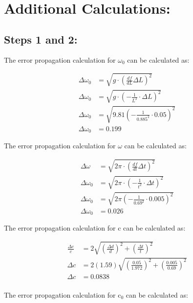 \documentclass[12pt, letterpaper, twoside]{article}
\begin{document}
\vfill\pagebreak

\appendix
\section{Additional Calculations:}

\subsection{Steps 1 and 2:}

The error propagation calculation for $\omega_0$ can be calculated as:

\begin{align*}
    \Delta\omega_0 &= \sqrt{g \cdot (\frac{df}{dL}\Delta L)^2} \\
    \Delta\omega_0 &= \sqrt{g \cdot (-\frac{1}{L^2}\cdot \Delta L)^2} \\
    \Delta\omega_0 &= \sqrt{9.81(-\frac{1}{0.885^2}\cdot 0.05)^2} \\
    \Delta\omega_0 &= 0.199
\end{align*}

The error propagation calculation for $\omega$ can be calculated as:

\begin{align*}
    \Delta\omega &= \sqrt{2\pi \cdot (\frac{df}{dt}\Delta t)^2} \\
    \Delta\omega_0 &= \sqrt{2\pi \cdot (-\frac{1}{t^2}\cdot \Delta t)^2} \\
    \Delta\omega_0 &= \sqrt{2\pi(-\frac{1}{0.69^2}\cdot 0.005)^2} \\
    \Delta\omega_0 &= 0.026
\end{align*}

The error propagation calculation for c can be calculated as:

\begin{align*}
    \frac{\Delta c}{c} &= 2\sqrt{(\frac{\Delta d}{d})^2 + (\frac{\Delta t}{t})^2} \\
    \Delta c &= 2(1.59)\sqrt{(\frac{0.05}{1.972})^2 + (\frac{0.005}{0.69})^2} \\
    \Delta c &=  0.0838\\
\end{align*}

\vfill\pagebreak

The error propagation calculation for c$_0$ can be calculated as:
\end{document}
